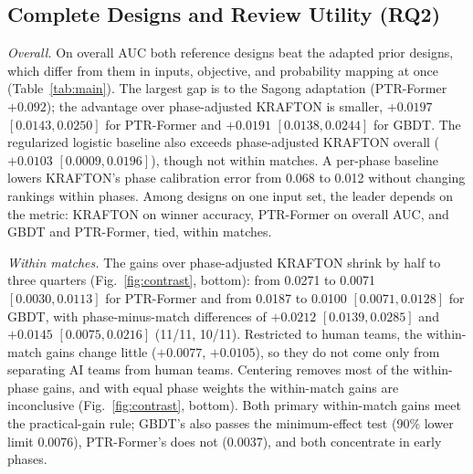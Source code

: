 \documentclass[sigconf,anonymous]{acmart}
\begin{document}
\subsection{Complete Designs and Review Utility (RQ2)}
\label{sec:results:designs}

\emph{Overall.} On overall AUC both reference designs beat the adapted prior designs, which differ from them in inputs, objective, and probability mapping at once (Table~\ref{tab:main}). The largest gap is to the Sagong adaptation (PTR-Former $+0.092$); the advantage over phase-adjusted KRAFTON is smaller, $+0.0197$ $[0.0143,\allowbreak 0.0250]$ for PTR-Former and $+0.0191$ $[0.0138,\allowbreak 0.0244]$ for GBDT. The regularized logistic baseline also exceeds phase-adjusted KRAFTON overall ($+0.0103$ $[0.0009,\allowbreak 0.0196]$), though not within matches. A per-phase baseline lowers KRAFTON's phase calibration error from 0.068 to 0.012 without changing rankings within phases. Among designs on one input set, the leader depends on the metric: KRAFTON on winner accuracy, PTR-Former on overall AUC, and GBDT and PTR-Former, tied, within matches.

\emph{Within matches.} The gains over phase-adjusted KRAFTON shrink by half to three quarters (Fig.~\ref{fig:contrast}, bottom): from 0.0271 to 0.0071 $[0.0030,\allowbreak 0.0113]$ for PTR-Former and from 0.0187 to 0.0100 $[0.0071,\allowbreak 0.0128]$ for GBDT, with phase-minus-match differences of $+0.0212$ $[0.0139,\allowbreak 0.0285]$ and $+0.0145$ $[0.0075,\allowbreak 0.0216]$ (11/11, 10/11). Restricted to human teams, the within-match gains change little ($+0.0077$, $+0.0105$), so they do not come only from separating AI teams from human teams. Centering removes most of the within-phase gains, and with equal phase weights the within-match gains are inconclusive (Fig.~\ref{fig:contrast}, bottom). Both primary within-match gains meet the practical-gain rule; GBDT's also passes the minimum-effect test (90\% lower limit 0.0076), PTR-Former's does not (0.0037), and both concentrate in early phases.
\end{document}
